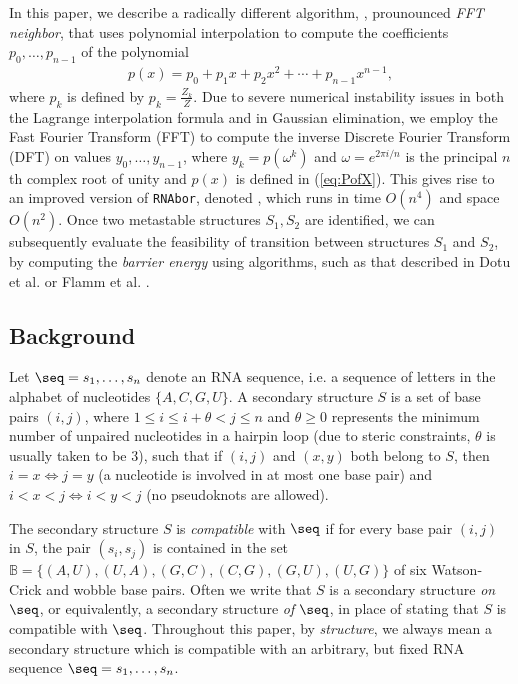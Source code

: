In this paper, we describe a radically different algorithm, \fftbor,
prounounced {\em FFT neighbor},
that uses polynomial interpolation to compute the
coefficients $p_0,\ldots,p_{n-1}$ of the polynomial
\begin{eqnarray}
\label{eq:PofX}
p(x) = p_0 + p_1 x + p_2 x^2 + \cdots + p_{n-1} x^{n-1},
\end{eqnarray}
where $p_k$ is defined by $p_k = \frac{Z_k}{Z}$.
Due to severe numerical instability issues in both the Lagrange
interpolation formula and in Gaussian elimination, we employ
the Fast Fourier Transform (FFT) to compute the inverse Discrete Fourier
Transform (DFT) on values $y_0,\ldots,y_{n-1}$, where $y_k = p(\omega^k)$ and
$\omega = e^{2 \pi i/n}$ is the principal $n$th complex root of unity and
$p(x)$ is defined in (\ref{eq:PofX}). This
gives rise to an improved version of {\tt RNAbor}, denoted \fftbor,
which runs in time $O(n^4)$ and space $O(n^2)$.
Once two metastable structures $S_1,S_2$ are identified, we can
subsequently evaluate the feasibility of transition between
structures $S_1$ and $S_2$,
by computing the {\em barrier energy} using algorithms, such as that
described in Dotu et al.  \cite{Dotu.nar10} or Flamm et al.
\cite{Flamm.r01}.





\subsection*{Background}

Let $\seq = s_1,\ldots,s_n$ denote an RNA sequence, i.e. a sequence
of letters in the alphabet of nucleotides $\{A,C,G,U\}$. A
secondary structure $S$ is a set of base pairs
$(i,j)$, where $1 \le i \le i+\theta < j \le n$ and $\theta \ge 0$
represents the minimum number of unpaired nucleotides in a hairpin loop
(due to steric constraints, $\theta$ is usually taken to be $3$),
such that if $(i,j)$ and $(x,y)$ both belong to $S$, then $i=x \iff j=y$
(a nucleotide is involved in at most one base pair)
and $i<x<j \iff i<y<j$ (no pseudoknots are allowed).

The secondary structure $S$ is {\em compatible}
with $\seq$ if for every base pair $(i,j)$ in $S$, the pair
$(s_i,s_j)$ is contained in the set
$\mathbb{B} = \{(A,U), (U,A), (G,C), (C,G), (G,U), (U,G)\}$
of six Watson-Crick and wobble base pairs. Often we write that
$S$ is a secondary structure {\em on} $\seq$, or equivalently,
a secondary structure {\em of} $\seq$,
in place of stating that $S$ is compatible with $\seq$.
Throughout this paper, by {\em structure}, we always mean a
secondary structure which is compatible with an arbitrary, but fixed
RNA sequence $\seq=s_1,\ldots,s_n$.

